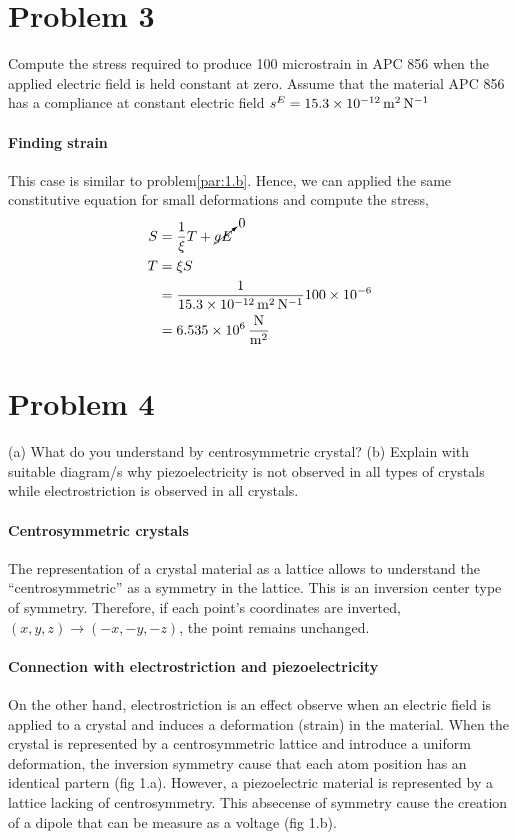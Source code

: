 \documentclass[../main.tex]{subfiles}
\begin{document}
\section{Problem 3}

Compute the stress required to produce 100 microstrain in APC 856 when the applied electric field is held constant at zero. 
Assume that the material APC 856 has a compliance at constant electric field $s^E=\SI{15.3d-12}{\meter\squared\per\newton}$

\paragraph{Finding strain} This case is similar to problem\ref{par:1.b}.
Hence, we can applied the same constitutive equation for small deformations and compute the stress,
\begin{align*}
    S &= \frac{1}{\xi}T + \cancelto{0}{g E} \\
    T &= \xi S \\
      &= \frac{1}{\SI{15.3d-12}{\meter\squared\per\newton}}\num{100d-6} \\
      &= \SI[per-mode=fraction]{6.535d6}{\newton\per\meter\squared}
\end{align*}


\section{Problem 4}

(a) What do you understand by centrosymmetric crystal? 
(b) Explain with suitable diagram/s why piezoelectricity is not observed in all types of crystals while electrostriction is observed in all crystals.

\paragraph{Centrosymmetric crystals} The representation of a crystal material as a lattice allows to understand the ``centrosymmetric'' as a symmetry in the lattice.
This is an inversion center type of symmetry.
Therefore, if each point's coordinates are inverted, $(x,y,z)\to(-x,-y,-z)$, the point remains unchanged.

\paragraph{Connection with electrostriction and piezoelectricity} 
On the other hand, electrostriction is an effect observe when an electric field is applied to a crystal and induces a deformation (strain) in the material.
When the crystal is represented by a centrosymmetric lattice and introduce a uniform deformation, the inversion symmetry cause that each atom position has an identical partern (fig 1.a).
However, a piezoelectric material is represented by a lattice lacking of centrosymmetry.
This absecense of symmetry cause the creation of a dipole that can be measure as a voltage (fig 1.b).
\end{document}
